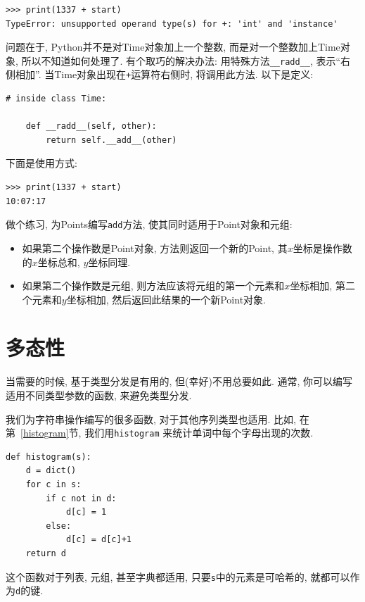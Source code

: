 \documentclass[10pt]{book}
\begin{document}
\begin{verbatim}
>>> print(1337 + start)
TypeError: unsupported operand type(s) for +: 'int' and 'instance'
\end{verbatim}
%
问题在于, Python并不是对Time对象加上一个整数, 
而是对一个整数加上Time对象, 
所以不知道如何处理了. 
有个取巧的解决办法: 用特殊方法\verb"__radd__", 表示``右侧相加''. 
当Time对象出现在{\tt +}运算符右侧时, 将调用此方法. 
以下是定义:

\begin{verbatim}
# inside class Time:

    def __radd__(self, other):
        return self.__add__(other)
\end{verbatim}
%
下面是使用方式:

\begin{verbatim}
>>> print(1337 + start)
10:07:17
\end{verbatim}
%

做个练习, 为Points编写{\tt add}方法, 使其同时适用于Point对象和元组:

\begin{itemize}

\item 如果第二个操作数是Point对象, 方法则返回一个新的Point, 
其$x$坐标是操作数的$x$坐标总和, $y$坐标同理. 

\item 如果第二个操作数是元组, 则方法应该将元组的第一个元素和$x$坐标相加, 
第二个元素和$y$坐标相加, 然后返回此结果的一个新Point对象. 

\end{itemize}


\section{多态性}
\label{polymorphism}

当需要的时候, 基于类型分发是有用的, 但(幸好)不用总要如此. 
通常, 你可以编写适用不同类型参数的函数, 来避免类型分发. 

我们为字符串操作编写的很多函数, 对于其他序列类型也适用. 
比如, 在第~\ref{histogram}节, 我们用{\tt histogram} 来统计单词中每个字母出现的次数. 

\begin{verbatim}
def histogram(s):
    d = dict()
    for c in s:
        if c not in d:
            d[c] = 1
        else:
            d[c] = d[c]+1
    return d
\end{verbatim}
%
这个函数对于列表, 元组, 甚至字典都适用, 只要{\tt s}中的元素是可哈希的, 
就都可以作为{\tt d}的键. 
\end{document}
